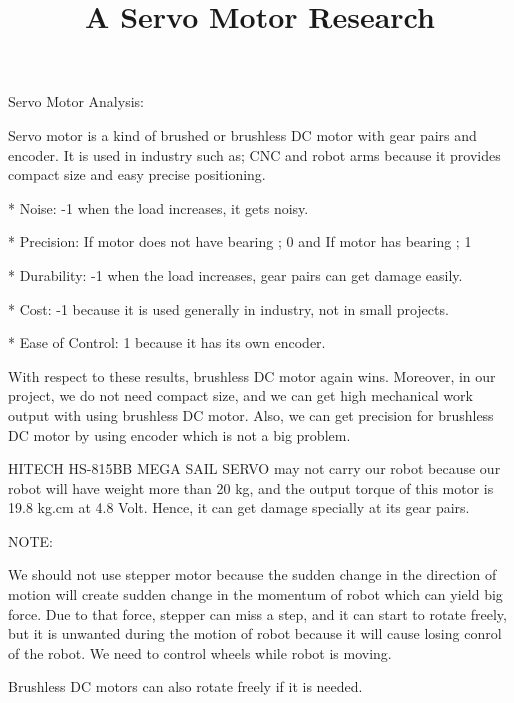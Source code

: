 \documentclass{article}
\title{A Servo Motor Research}
\begin{document}
\maketitle

Servo Motor Analysis:

Servo motor is a kind of brushed or brushless DC motor with gear pairs and encoder. It is used in industry such as; CNC and robot arms because it provides compact size and easy precise positioning.

* Noise: -1 when the load increases, it gets noisy.

* Precision: If motor does not have bearing ; 0
and If motor has bearing ; 1

* Durability: -1 when the load increases, gear pairs can get damage easily.

* Cost: -1 because it is used generally in industry, not in small projects.

* Ease of Control: 1 because it has its own encoder.

With respect to these results, brushless DC motor again wins. Moreover, in our project, we do not need compact size, and we can get high mechanical work output with using brushless DC motor. Also, we can get precision for brushless DC motor by using encoder which is not a big problem.

HITECH HS-815BB MEGA SAIL SERVO may not carry our robot because our robot will have weight more than 20 kg, and the output torque of this motor is 19.8 kg.cm at 4.8 Volt. Hence, it can get damage specially at its gear pairs.

NOTE: 

We should not use stepper motor because the sudden change in the direction of motion will create sudden change in the momentum of robot which can yield big force. Due to that force, stepper can miss a step, and it can start to rotate freely, but it is unwanted during the motion of robot because it will cause losing conrol of the robot. We need to control wheels while robot is moving.

Brushless DC motors can also rotate freely if it is needed.
\end{document}
